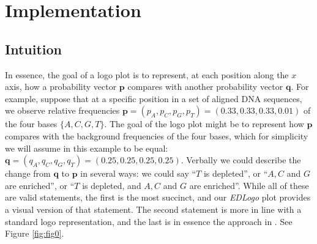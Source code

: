 \documentclass{bmcart}
\def\p{{\mathbf p}}
\def\q{{\mathbf q}}
\begin{document}

\section*{Implementation}

\subsection*{Intuition}

In essence, the goal of a logo plot is to represent, at each position along the $x$ axis, how a probability vector $\p$ compares with another probability vector $\q$. For example, suppose that at a specific position in a set of aligned DNA sequences, we observe relative frequencies $\p = (p_A, p_C, p_G, p_T) = (0.33, 0.33, 0.33, 0.01)$ of the four bases $\{A,C,G,T\}$. 
The goal of the logo plot might be to represent how
$\p$ compares with the background frequencies of the four bases, which 
for simplicity we will assume in this example to be equal: $\q = (q_A, q_C, q_G, q_T) = (0.25, 0.25, 0.25, 0.25)$.  
Verbally we could describe the change from $\q$ to $\p$ in several ways: 
we could say ``$T$ is depleted'', or
``$A, C$ and $G$ are enriched'', or ``$T$ is depleted, and $A,C$ and $G$ are enriched''. While all of these are valid statements, the first is the
most succinct, and our \textit{EDLogo} plot provides a visual version of that
statement. The second statement
is more in line with a standard logo representation, and the last is 
in essence the approach in \cite{Thomsen2012}. See 
Figure \ref{fig:fig0}.
 
 
\end{document}
